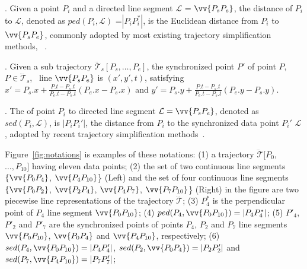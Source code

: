 . Given a point $P_i$ and a directed line segment $\mathcal{L}$ = $\vv{P_{s}P_{e}}$, the distance of $P_i$ to $\mathcal{L}$, denoted as $ped(P_i, \mathcal{L})$ ={$|P_iP_i^*|$}, is the Euclidean distance from $P_i$ to $\vv{P_sP_e}$, commonly adopted by most existing trajectory simplification methods, \eg~\cite{Douglas:Peucker, Hershberger:Speeding, Keogh:online, Chen:Fast, Liu:BQS}.


. Given a sub trajectory $\dddot{\mathcal{T}}_s[P_s, \ldots, P_e]$, the synchronized point $P'$ of point $P$, $P \in \dddot{\mathcal{T}}_s$, ~\wrt line $\vv{P_sP_e}$ is $(x', y', t)$, satisfying $x' = P_s.x +  \frac{P.t-P_s.t}{P_e.t-P_s.t}(P_e.x - P_s.x)$ and $y' = P_s.y +  \frac{P.t-P_s.t}{P_e.t-P_s.t}(P_e.y - P_s.y)$.


. The \sed of point $P_i$ to directed line segment $\mathcal{L} = \vv{P_{s}P_{e}}$, denoted as $sed(P_i, \mathcal{L})$, is $|P_iP_i'|$, the distance from $P_i$ to the synchronized data point $P_i'$ \wrt $\mathcal{L}$, adopted by recent trajectory simplification methods~\cite{Meratnia:Spatiotemporal, Chen:Fast, Muckell:Compression, Popa:Spatio}.





\begin{example}
\label{exm-notations}
Figure~\ref{fig:notations} is examples of these notations:
(1) a trajectory $\dddot{\mathcal{T}}[P_0$, $\ldots, P_{10}]$ having eleven data points;
(2) the set of two continuous line segments $\{\vv{P_0P_4}$, $\vv{P_4P_{10}}$\} (Left) and the set of four continuous line segments $\{\vv{P_0P_2}$, $\vv{P_2P_4}$, $\vv{P_4P_7}$, $\vv{P_7P_{10}}$\} (Right) in the figure are two piecewise line representations of the trajectory $\dddot{\mathcal{T}}$;
(3) $P^*_4$ is the perpendicular point of $P_4$ \wrt line segment $\vv{P_0P_{10}}$;
(4) $ped(P_4, \vv{P_0P_{10}})=|P_4P^*_4|$;
(5) $P'_4$, $P'_2$ and $P'_7$ are the synchronized points of points $P_4$, $P_2$ and $P_7$ \wrt line segments $\vv{P_0P_{10}}$, $\vv{P_0P_{4}}$ and $\vv{P_4P_{10}}$, respectively;
(6) $sed(P_4, \vv{P_0P_{10}})= |P_4P'_4|$, $sed(P_2, \vv{P_0P_{4}})= |P_2P'_2|$ and $sed(P_7, \vv{P_4P_{10}}) = |P_7P'_7|$;
\end{example}


